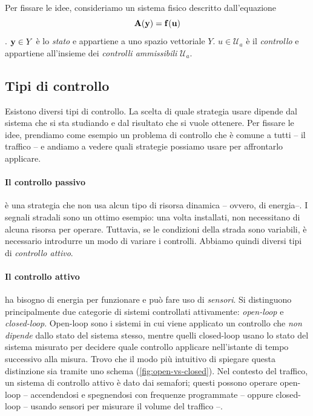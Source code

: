 Per fissare le idee, consideriamo un sistema fisico descritto dall'equazione
\begin{equation*}
    \mathbf{A}( \mathbf{y}) = \mathbf{f}( \mathbf{u})
\end{equation*}
. $\mathbf{y} \in Y$ è lo \emph{stato} e appartiene a uno spazio vettoriale
$Y$. $u \in \mathcal U_a$ è il \emph{controllo} e appartiene all'insieme dei
\emph{controlli ammissibili} $\mathcal U_a$.


\subsection{Tipi di controllo}
\label{subsec:classificazione-dei-controlli}
Esistono diversi tipi di controllo. La scelta di quale strategia
usare dipende dal sistema che si sta studiando e dal risultato che si vuole
ottenere.
Per fissare le idee, prendiamo come esempio un problema di controllo che è
comune a tutti -- il traffico -- e andiamo a vedere quali strategie possiamo
usare per affrontarlo applicare.

\paragraph{Il controllo passivo} è una strategia che non usa alcun tipo di
risorsa dinamica -- ovvero, di energia--.
I segnali stradali sono un ottimo esempio: una volta installati, non necessitano
di alcuna risorsa per operare.
Tuttavia, se le condizioni della strada sono variabili, è necessario
introdurre un modo di variare i controlli. Abbiamo quindi diversi tipi
di \emph{controllo attivo}.

\paragraph{Il controllo attivo} ha bisogno di energia per funzionare e può fare
uso di \emph{sensori}.
Si distinguono principalmente due categorie di sistemi controllati attivamente:
\emph{open-loop} e \emph{closed-loop}. Open-loop sono i sistemi in cui viene
applicato un controllo che \emph{non dipende} dallo stato del sistema stesso,
mentre quelli closed-loop usano lo stato del sistema misurato
per decidere quale controllo applicare nell'istante di tempo successivo alla misura.
Trovo che il modo più intuitivo di spiegare questa distinzione sia tramite uno
schema (\autoref{fig:open-vs-closed}).
Nel contesto del traffico, un sistema di controllo attivo è dato dai semafori;
questi possono operare open-loop -- accendendosi e spegnendosi con
frequenze programmate -- oppure closed-loop -- usando sensori per misurare il volume del traffico --.

